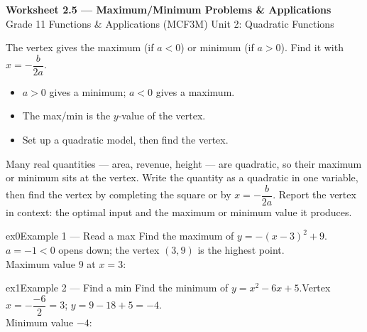 \documentclass[11pt]{article}
\begin{document}
\begin{center}
{\LARGE\bfseries\color{titleblue}Worksheet 2.5 --- Maximum/Minimum Problems \& Applications}\\[2pt]
{\small Grade 11 Functions \& Applications (MCF3M) \textperiodcentered{} Unit 2: Quadratic Functions}
\end{center}

\begin{ideabox}
The vertex gives the maximum (if $a<0$) or minimum (if $a>0$). Find it with $x=-\dfrac{b}{2a}$.
\begin{itemize}[leftmargin=*,itemsep=2pt]
  \item $a>0$ gives a minimum; $a<0$ gives a maximum.
  \item The max/min is the $y$-value of the vertex.
  \item Set up a quadratic model, then find the vertex.
\end{itemize}
\end{ideabox}

\begin{learnbox}
Many real quantities — area, revenue, height — are quadratic, so their maximum or minimum sits at the vertex.
Write the quantity as a quadratic in one variable, then find the vertex by completing the square or by $x=-\dfrac{b}{2a}$.
Report the vertex in context: the optimal input and the maximum or minimum value it produces.
\end{learnbox}


\begin{example}{ex0}{Example 1 --- Read a max}
Find the maximum of $y=-(x-3)^2+9$.\soln $a=-1<0$ opens down; the vertex $(3,9)$ is the highest point. \\ Maximum value $9$ at $x=3$:
\end{example}

\begin{example}{ex1}{Example 2 --- Find a min}
Find the minimum of $y=x^2-6x+5$.\soln Vertex $x=-\dfrac{-6}{2}=3$; $y=9-18+5=-4$. \\ Minimum value $-4$:
\end{example}
\end{document}
